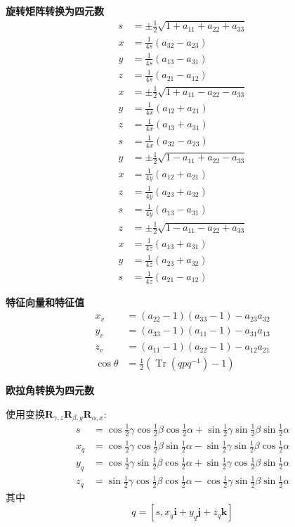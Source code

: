 \textbf{旋转矩阵转换为四元数}
$$
\begin{aligned}
s & =\pm \frac{1}{2} \sqrt{1+a_{11}+a_{22}+a_{33}} \\
x & =\frac{1}{4 s}\left(a_{32}-a_{23}\right) \\
y & =\frac{1}{4 s}\left(a_{13}-a_{31}\right) \\
z & =\frac{1}{4 s}\left(a_{21}-a_{12}\right) \\
x & =\pm \frac{1}{2} \sqrt{1+a_{11}-a_{22}-a_{33}} \\
y & =\frac{1}{4 x}\left(a_{12}+a_{21}\right) \\
z & =\frac{1}{4 x}\left(a_{13}+a_{31}\right) \\
s & =\frac{1}{4 x}\left(a_{32}-a_{23}\right) \\
y & =\pm \frac{1}{2} \sqrt{1-a_{11}+a_{22}-a_{33}}\\
x & =\frac{1}{4 y}\left(a_{12}+a_{21}\right) \\
z & =\frac{1}{4 y}\left(a_{23}+a_{32}\right) \\
s & =\frac{1}{4 y}\left(a_{13}-a_{31}\right) \\
z & =\pm \frac{1}{2} \sqrt{1-a_{11}-a_{22}+a_{33}} \\
x & =\frac{1}{4 z}\left(a_{13}+a_{31}\right) \\
y & =\frac{1}{4 z}\left(a_{23}+a_{32}\right) \\
s & =\frac{1}{4 z}\left(a_{21}-a_{12}\right)
\end{aligned}
$$

\textbf{特征向量和特征值}
$$
\begin{aligned}
x_{v} & =\left(a_{22}-1\right)\left(a_{33}-1\right)-a_{23} a_{32} \\
y_{v} & =\left(a_{33}-1\right)\left(a_{11}-1\right)-a_{31} a_{13} \\
z_{v} & =\left(a_{11}-1\right)\left(a_{22}-1\right)-a_{12} a_{21} \\
\cos \theta & =\frac{1}{2}\left(\operatorname{Tr}\left(q p q^{-1}\right)-1\right)
\end{aligned}
$$

\textbf{欧拉角转换为四元数}

使用变换$\mathbf{R}_{\gamma, z} \mathbf{R}_{\beta, y} \mathbf{R}_{\alpha, x}$:
$$
\begin{aligned}
s & =\cos \frac{1}{2} \gamma \cos \frac{1}{2} \beta \cos \frac{1}{2} \alpha+\sin \frac{1}{2} \gamma \sin \frac{1}{2} \beta \sin \frac{1}{2} \alpha \\
x_{q} & =\cos \frac{1}{2} \gamma \cos \frac{1}{2} \beta \sin \frac{1}{2} \alpha-\sin \frac{1}{2} \gamma \sin \frac{1}{2} \beta \cos \frac{1}{2} \alpha \\
y_{q} & =\cos \frac{1}{2} \gamma \sin \frac{1}{2} \beta \cos \frac{1}{2} \alpha+\sin \frac{1}{2} \gamma \cos \frac{1}{2} \beta \sin \frac{1}{2} \alpha \\
z_{q} & =\sin \frac{1}{2} \gamma \cos \frac{1}{2} \beta \cos \frac{1}{2} \alpha-\cos \frac{1}{2} \gamma \sin \frac{1}{2} \beta \sin \frac{1}{2} \alpha
\end{aligned}
$$
其中
$$
q=\left[s, x_{q} \mathbf{i}+y_{q} \mathbf{j}+z_{q} \mathbf{k}\right]
$$

